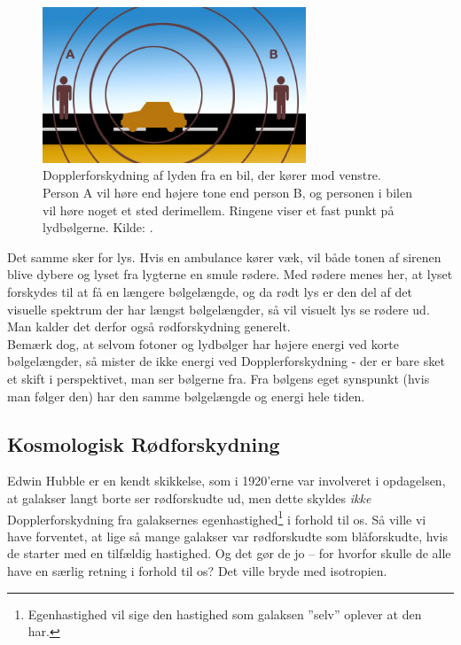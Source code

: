 \begin{figure}[h!]
	\centering
	\includegraphics[width=0.7\textwidth]{Kosmo/2017/img/doppler.jpg}
	\caption{Dopplerforskydning af lyden fra en bil, der kører mod venstre. Person A vil høre end højere tone end person B, og personen i bilen vil høre noget et sted derimellem. Ringene viser et fast punkt på lydbølgerne. Kilde: \cite{DopplerIllustration}.}
	\label{doppler} 
\end{figure}

Det samme sker for lys. Hvis en ambulance kører væk, vil både tonen af sirenen blive dybere og lyset fra lygterne en smule rødere. Med rødere menes her, at lyset forskydes til at få en længere bølgelængde, og da rødt lys er den del af det visuelle spektrum der har længst bølgelængder, så vil visuelt lys se rødere ud. Man kalder det derfor også rødforskydning generelt. \\
Bemærk dog, at selvom fotoner og lydbølger har højere energi ved korte bølgelængder, så mister de ikke energi ved Dopplerforskydning - der er bare sket et skift i perspektivet, man ser bølgerne fra. Fra bølgens eget synspunkt (hvis man følger den) har den samme bølgelængde og energi hele tiden.
\subsection{Kosmologisk Rødforskydning}
Edwin Hubble er en kendt skikkelse, som i 1920'erne var involveret i opdagelsen, at galakser langt borte ser rødforskudte ud, men dette skyldes \emph{ikke} Dopplerforskydning fra galaksernes egenhastighed\footnote{Egenhastighed vil sige den hastighed som galaksen ''selv'' oplever at den har.} i forhold til os. Så ville vi have forventet, at lige så mange galakser var rødforskudte som blåforskudte, hvis de starter med en tilfældig hastighed. Og det gør de jo -- for hvorfor skulle de alle have en særlig retning i forhold til os? Det ville bryde med isotropien. 

